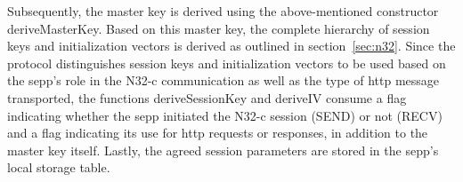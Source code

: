 Subsequently, the master key is derived using the above-mentioned constructor {\sffamily deriveMasterKey}.
Based on this master key, the complete hierarchy of session keys and initialization vectors is derived as outlined in section~\ref{sec:n32}.
Since the protocol distinguishes session keys and initialization vectors to be used based on the \gls{sepp}'s role in the N32-c communication as well as the type of \gls{http} message transported, the functions {\sffamily deriveSessionKey} and {\sffamily deriveIV} consume a flag indicating whether the \gls{sepp} initiated the N32-c session ({\sffamily SEND}) or not ({\sffamily RECV}) and a flag indicating its use for \gls{http} requests or responses, in addition to the master key itself.
Lastly, the agreed session parameters are stored in the \gls{sepp}'s local storage table.

